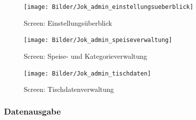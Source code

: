 			\begin{figure}[H]
			\begin{centering}
			\texttt{[image: Bilder/Jok\_admin\_einstellungsueberblick]}
			\par\end{centering}
			\caption{Screen: Einstellungsüberblick}
			\label{Screen: Einstellungsüberblick}
			\end{figure}  
			\begin{figure}[H]
			\begin{centering}
			\texttt{[image: Bilder/Jok\_admin\_speiseverwaltung]}
			\par\end{centering}
			\caption{Screen: Speise- und Kategorieverwaltung}
			\label{Screen: Speise- und Kategorieverwaltung}
			\end{figure}  
			\begin{figure}[H]
			\begin{centering}
			\texttt{[image: Bilder/Jok\_admin\_tischdaten]}
			\par\end{centering}
			\caption{Screen: Tischdatenverwaltung}
			\label{Screen: Tischdatenverwaltung}
			\end{figure} 
\pagebreak 				
    \subsubsection{Datenausgabe}

